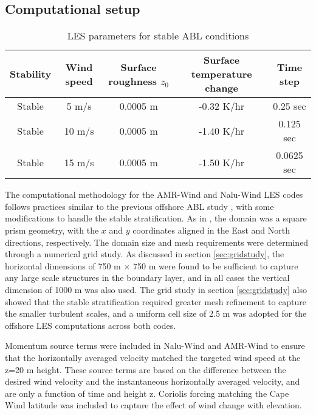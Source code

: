 
\subsection{\label{sec:CFDsetup}Computational setup}

\begin{table}
\caption{\label{tab:z0tempparam} LES parameters for stable ABL conditions}
\centering
\begin{tabular}{ccccc}
  \hline
  Stability & Wind speed & Surface roughness $z_0$ & Surface
  temperature change & Time step\\
  \hline
  Stable       & 5  m/s           & 0.0005 m       & -0.32 K/hr   & 0.25 sec   \\
  Stable       & 10 m/s           & 0.0005 m       & -1.40 K/hr   & 0.125 sec  \\
  Stable       & 15 m/s           & 0.0005 m       & -1.50 K/hr   & 0.0625 sec \\
\hline
\end{tabular}
\end{table}

The computational methodology for the AMR-Wind and Nalu-Wind LES codes
follows practices similar to the previous offshore ABL study \cite{cheung2020large}, with
some modifications to handle the stable stratification.  As in
\cite{cheung2020large}, the domain was a square prism geometry, with
the $x$ and $y$ coordinates aligned in the East and North directions,
respectively.  The domain size and mesh requirements were determined
through a numerical grid study.  As discussed in section
\ref{sec:gridstudy}, the horizontal dimensions of 750 m $\times$ 750 m
were found to be sufficient to capture any large scale structures in
the boundary layer, and in all cases the vertical dimension of 1000 m
was also used.  The grid study in section \ref{sec:gridstudy} also
showed that the stable stratification required greater mesh refinement
to capture the smaller turbulent scales, and a uniform cell size of
2.5 m was adopted for the offshore LES computations across both codes.

Momentum source terms were included in Nalu-Wind and AMR-Wind to
ensure that the horizontally averaged velocity matched the targeted
wind speed at the z=20 m height.  These source terms are based on the
difference between the desired wind velocity and the instantaneous
horizontally averaged velocity, and are only a function of time and
height z.  Coriolis forcing matching the Cape Wind latitude was
included to capture the effect of wind change with elevation.

